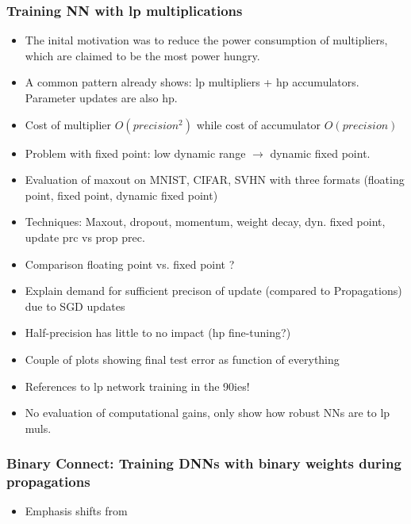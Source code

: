 \documentclass{article}
\begin{document}
\subsubsection*{Training NN with lp multiplications}
    \begin{itemize}
    \item The inital motivation was to reduce the power consumption of multipliers, which are claimed to be the most power hungry.
    \item A common pattern already shows: lp multipliers + hp accumulators. Parameter updates are also hp.
    \item Cost of multiplier $O(precision^2)$ while cost of accumulator $O(precision)$
    \item Problem with fixed point: low dynamic range $\rightarrow$ dynamic fixed point.
    \item Evaluation of maxout on MNIST, CIFAR, SVHN with three formats (floating
    point, fixed point, dynamic fixed point)
    \item Techniques: Maxout, dropout, momentum, weight decay, dyn. fixed point, update prc vs prop prec.
    \item Comparison floating point vs. fixed point ?
    \item Explain demand for sufficient precison of update (compared to Propagations) due to SGD updates
    \item Half-precision has little to no impact (hp fine-tuning?)
    \item Couple of plots showing final test error as function of everything
    \item References to lp network training in the 90ies!
    \item No evaluation of computational gains, only show how robust NNs are to lp muls.
    \end{itemize}

\subsubsection*{Binary Connect: Training DNNs with binary weights during propagations}
\begin{itemize}
\item Emphasis shifts from 
\end{itemize}
\end{document}
